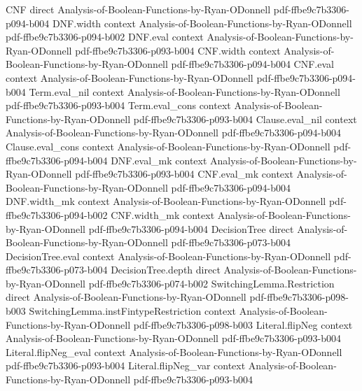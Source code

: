 \begin{theorem}
\proofstep
  {CNF}
  {direct}
  {Analysis-of-Boolean-Functions-by-Ryan-ODonnell}
  {pdf-ffbe9c7b3306-p094-b004}
\proofstep
  {DNF.width}
  {context}
  {Analysis-of-Boolean-Functions-by-Ryan-ODonnell}
  {pdf-ffbe9c7b3306-p094-b002}
\proofstep
  {DNF.eval}
  {context}
  {Analysis-of-Boolean-Functions-by-Ryan-ODonnell}
  {pdf-ffbe9c7b3306-p093-b004}
\proofstep
  {CNF.width}
  {context}
  {Analysis-of-Boolean-Functions-by-Ryan-ODonnell}
  {pdf-ffbe9c7b3306-p094-b004}
\proofstep
  {CNF.eval}
  {context}
  {Analysis-of-Boolean-Functions-by-Ryan-ODonnell}
  {pdf-ffbe9c7b3306-p094-b004}
\proofstep
  {Term.eval_nil}
  {context}
  {Analysis-of-Boolean-Functions-by-Ryan-ODonnell}
  {pdf-ffbe9c7b3306-p093-b004}
\proofstep
  {Term.eval_cons}
  {context}
  {Analysis-of-Boolean-Functions-by-Ryan-ODonnell}
  {pdf-ffbe9c7b3306-p093-b004}
\proofstep
  {Clause.eval_nil}
  {context}
  {Analysis-of-Boolean-Functions-by-Ryan-ODonnell}
  {pdf-ffbe9c7b3306-p094-b004}
\proofstep
  {Clause.eval_cons}
  {context}
  {Analysis-of-Boolean-Functions-by-Ryan-ODonnell}
  {pdf-ffbe9c7b3306-p094-b004}
\proofstep
  {DNF.eval_mk}
  {context}
  {Analysis-of-Boolean-Functions-by-Ryan-ODonnell}
  {pdf-ffbe9c7b3306-p093-b004}
\proofstep
  {CNF.eval_mk}
  {context}
  {Analysis-of-Boolean-Functions-by-Ryan-ODonnell}
  {pdf-ffbe9c7b3306-p094-b004}
\proofstep
  {DNF.width_mk}
  {context}
  {Analysis-of-Boolean-Functions-by-Ryan-ODonnell}
  {pdf-ffbe9c7b3306-p094-b002}
\proofstep
  {CNF.width_mk}
  {context}
  {Analysis-of-Boolean-Functions-by-Ryan-ODonnell}
  {pdf-ffbe9c7b3306-p094-b004}
\proofstep
  {DecisionTree}
  {direct}
  {Analysis-of-Boolean-Functions-by-Ryan-ODonnell}
  {pdf-ffbe9c7b3306-p073-b004}
\proofstep
  {DecisionTree.eval}
  {context}
  {Analysis-of-Boolean-Functions-by-Ryan-ODonnell}
  {pdf-ffbe9c7b3306-p073-b004}
\proofstep
  {DecisionTree.depth}
  {direct}
  {Analysis-of-Boolean-Functions-by-Ryan-ODonnell}
  {pdf-ffbe9c7b3306-p074-b002}
\proofstep
  {SwitchingLemma.Restriction}
  {direct}
  {Analysis-of-Boolean-Functions-by-Ryan-ODonnell}
  {pdf-ffbe9c7b3306-p098-b003}
\proofstep
  {SwitchingLemma.instFintypeRestriction}
  {context}
  {Analysis-of-Boolean-Functions-by-Ryan-ODonnell}
  {pdf-ffbe9c7b3306-p098-b003}
\proofstep
  {Literal.flipNeg}
  {context}
  {Analysis-of-Boolean-Functions-by-Ryan-ODonnell}
  {pdf-ffbe9c7b3306-p093-b004}
\proofstep
  {Literal.flipNeg_eval}
  {context}
  {Analysis-of-Boolean-Functions-by-Ryan-ODonnell}
  {pdf-ffbe9c7b3306-p093-b004}
\proofstep
  {Literal.flipNeg_var}
  {context}
  {Analysis-of-Boolean-Functions-by-Ryan-ODonnell}
  {pdf-ffbe9c7b3306-p093-b004}

\end{theorem}
